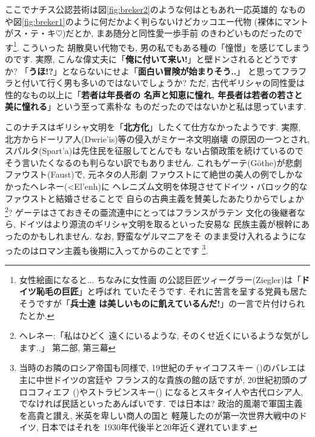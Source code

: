 ここでナチス公認芸術は図\ref{fig:breker2}のような何はともあれ一応英雄的
なものや図\ref{fig:breker1}のように何だかよく判らないけどカッコエー代物
(裸体にマントがス・テ・キ$\heartsuit$)だとか, まあ随分と同性愛一歩手前
のきわどいものだったのです\footnote{女性絵画になると... ちなみに女性画
の公認巨匠ツィーグラー(Ziegler)は「\textbf{ドイツ恥毛の巨匠}」と呼ばれ
ていたそうです. それに苦言を呈する党員も居たそうですが「\textbf{兵士達
は美しいものに飢えているんだ!}」の一言で片付けられたとか.}. こういった
胡散臭い代物でも, 男の私でもある種の「憧憬」を感じてしまうのです. 実際,
 こんな偉丈夫に「\textbf{俺に付いて来い!}」と壁ドンされるとどうですか?
 「\textbf{うほ!?}」とならないにせよ「\textbf{面白い冒険が始まりそう..}」
と思ってフラフラと付いて行く男も多いのではないでしょうか?
 ただ, 古代ギリシャの同性愛は性的なもの以上に「\textbf{若者は年長者の
名声と知恵に憧れ, 年長者は若者の若さと美に憧れる}」という至って素朴な
ものだったのではないかと私は思っています.
\newline

このナチスはギリシャ文明を「\textbf{北方化}」したくて仕方なかったようです.
 実際, 北方からドーリア人(\textgreek{Dwrie'is})等の侵入がミケーネ文明崩壊
の原因の一つとされ, スパルタ(\textgreek{Spart'a})は先住民を征服してとんでも
ない占領政策を続けているのでそう言いたくなるのも判らない訳でもありません.
 これもゲーテ(G\"othe)が悲劇ファウスト(Faust)\cite{ゲーテ}で, 元ネタの人形劇
ファウストにて絶世の美人の例でしかなかったヘレネー(\textgreek{<El'enh})に
ヘレニズム文明を体現させてドイツ・バロック的なファウストと結婚させることで
自らの古典主義を賛美したあたりからでしょか\footnote{ヘレネー:「私はひどく
遠くにいるような, そのくせ近くにいるような気がします..」\cite{ゲーテ}
第二部, 第三幕}?  ゲーテはさておきその亜流連中にとってはフランスがラテン
文化の後継者なら, ドイツはより源流のギリシャ文明を取るといった安易な
民族主義が根幹にあったのかもしれません. なお, 野蛮なゲルマニアをそ
のまま受け入れるようになったのはロマン主義も後期に入ってからのことです
\footnote{当時のお隣のロシア帝国も同様で, 19世紀のチャイコフスキー
({})のバレエは主に中世ドイツの宮廷や
フランス的な貴族の館の話ですが, 20世紀初頭のプロコフィエフ
({})やストラビンスキー({})
になるとスキタイ人や古代ロシア人, でなければ民話といったあんばいです.
 では日本は? 政治的風潮で軍国主義を高貴と讃え, 米英を卑しい商人の国と
軽蔑したのが第一次世界大戦中のドイツ\cite{クラウス}, 日本ではそれを
1930年代後半と20年近く遅れています.}.
\newline

